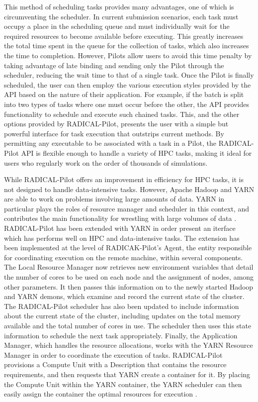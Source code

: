 \documentclass[]{article}
\begin{document}
	This method of scheduling tasks provides many advantages, one of which is circumventing the scheduler. In current submission scenarios, each task must occupy a place in the scheduling queue and must individually wait for the required resources to become available before executing. This greatly increases the total time spent in the queue for the collection of tasks, which also increases the time to completion. However, Pilots allow users to avoid this time penalty by taking advantage of late binding and sending only the Pilot through the scheduler, reducing the wait time to that of a single task. Once the Pilot is finally scheduled, the user can then employ the various execution styles provided by the API based on the nature of their application. For example, if the batch is split into two types of tasks where one must occur before the other, the API provides functionality to schedule and execute such chained tasks. This, and the other options provided by RADICAL-Pilot, presents the user with a simple but powerful interface for task execution that outstrips current methods. By permitting any executable to be associated with a task in a Pilot, the RADICAL-Pilot API is flexible enough to handle a variety of HPC tasks, making it ideal for users who regularly work on the order of thousands of simulations.

	While RADICAL-Pilot offers an improvement in efficiency for HPC tasks, it is not designed to handle data-intensive tasks. However, Apache Hadoop and YARN are able to work on problems involving large amounts of data. YARN in particular plays the roles of resource manager and scheduler in this context, and contributes the main functionality for wrestling with large volumes of data \cite{apache_hadoop_yarn}. RADICAL-Pilot has been extended with YARN in order present an iterface which has performs well on HPC and data-intensive tasks. The extension has been implemented at the level of RADICAK-Pilot's Agent, the entity responsible for coordinating execution on the remote machine, within several components. The Local Resource Manager now retrieves new environment variables that detail the number of cores to be used on each node and the assignment of nodes, among other parameters. It then passes this information on to the newly started Hadoop and YARN demons, which examine and record the current state of the cluster. The RADICAL-Pilot scheduler has also been updated to include information about the current state of the cluster, including updates on the total memory available and the total number of cores in use. The scheduler then uses this state information to schedule the next task appropriately. Finally, the Application Manager, which handles the resource allocations, works with the YARN Resource Manager in order to coordinate the execution of tasks. RADICAL-Pilot provisions a Compute Unit with a Description that contains the resource requirements, and then requests that YARN create a container for it. By placing the Compute Unit within the YARN container, the YARN scheduler can then easily assign the container the optimal resources for execution \cite{hadoop_paper}. 
\end{document}

